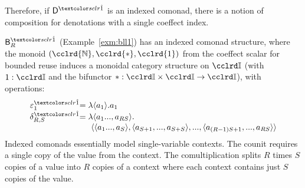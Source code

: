 Therefore, if $\D^\sunit$ is an indexed comonad, there is a notion of composition for
denotations with a single coeffect index. %

\begin{example}
$\BLL^\sunit_R$ (Example~\ref{exm:bll1}) has an indexed comonad structure, where
the monoid $(\cclrd{\mathbb{N}}, \cclrd{\ast}, \cclrd{1})$ from the coeffect scalar for bounded reuse
induces a monoidal category structure on $\Icat$ (with $1 : \Icat$ and the bifunctor
$\ast : \Icat \times \Icat \rightarrow \Icat$), with operations:
%
\begin{align*}
\begin{array}{rl}
\varepsilon^\sunit_{1} & \hspace{-1em} = \lambda \langle{a_1}\rangle . a_1 \\
\hspace{-0.5em}
\delta^\sunit_{R,S} & \hspace{-1em} = \lambda \langle{a_1 ..., a_{R S}}\rangle . \\
& \hspace{0.4em} \langle{\langle{a_1 ..., a_S}\rangle, \langle{a_{S+1},..., a_{S+S}}\rangle}, ..., \langle{a_{(R - 1)S + 1},..., a_{R S}}\rangle\rangle
\end{array}
\end{align*}
Indexed comonads essentially model single-variable contexts.
The counit requires a single copy of the value from the context. 
The comultiplication splits $R$ times $S$ copies of a value into
$R$ copies of a context where each context contains just $S$ copies of the value.
\label{exm:bll2}
\end{example}

